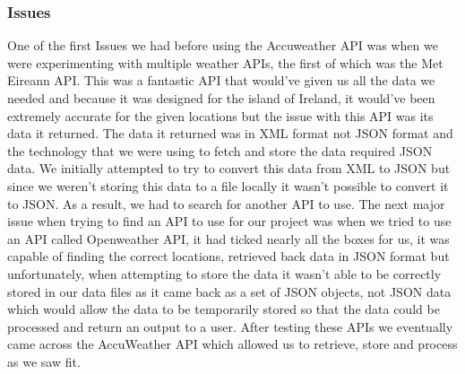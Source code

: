 \subsubsection{Issues}
One of the first Issues we had before using the Accuweather API was when we were experimenting with multiple weather APIs, the first of which was the Met Eireann API. This was a fantastic API that would've given us all the data we needed and because it was designed for the island of Ireland, it would've been extremely accurate for the given locations but the issue with this API was its data it returned.
\newline
\newline
The data it returned was in XML format not JSON format and the technology that we were using to fetch and store the data required JSON data. We initially attempted to try to convert this data from XML to JSON but since we weren't storing this data to a file locally it wasn't possible to convert it to JSON. As a result, we had to search for another API to use.
\newline
\newline
The next major issue when trying to find an API to use for our project was when we tried to use an API called Openweather API, it had ticked nearly all the boxes for us, it was capable of finding the correct locations, retrieved back data in JSON format but unfortunately, when attempting to store the data it wasn’t able to be correctly stored in our data files as it came back as a set of JSON objects, not JSON data which would allow the data to be temporarily stored so that the data could be processed and return an output to a user. After testing these APIs we eventually came across the AccuWeather API which allowed us to retrieve, store and process as we saw fit.

